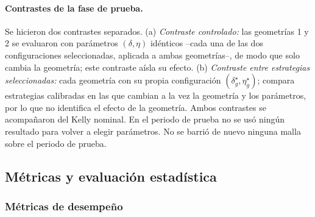 \paragraph{Contrastes de la fase de prueba.}\label{sec:contrastes} Se hicieron dos contrastes separados. (a) \emph{Contraste controlado:} las geometrías 1 y 2 se evaluaron con parámetros $(\delta,\eta)$ idénticos --cada una de las dos configuraciones seleccionadas, aplicada a ambas geometrías--, de modo que solo cambia la geometría; este contraste aísla su efecto. (b) \emph{Contraste entre estrategias seleccionadas:} cada geometría con su propia configuración $(\delta_g^\star,\eta_g^\star)$; compara estrategias calibradas en las que cambian a la vez la geometría y los parámetros, por lo que no identifica el efecto de la geometría. Ambos contrastes se acompañaron del Kelly nominal. En el periodo de prueba no se usó ningún resultado para volver a elegir parámetros.
 No se barrió de nuevo ninguna malla sobre el periodo de prueba.

\subsection{Métricas y evaluación estadística}\label{sec:metricas}

\subsubsection{Métricas de desempeño}

